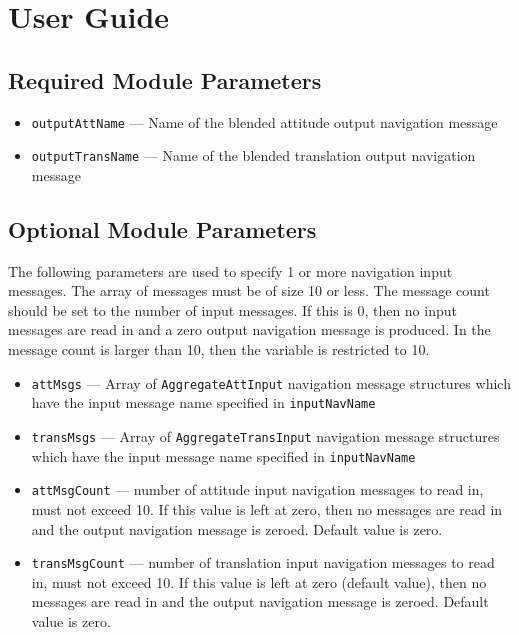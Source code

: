 
\section{User Guide}
\subsection{Required Module Parameters}
\begin{itemize}
	\item {\tt outputAttName} --- Name of the blended attitude output navigation message 
	\item {\tt outputTransName} --- Name of the blended translation output navigation message 
\end{itemize}


\subsection{Optional Module Parameters}
The following parameters are used to specify 1 or more navigation input messages.  The array of messages must be of size 10 or less.  The message count should be set to the number of input messages.  If this is 0, then no input messages are read in and a zero output navigation message is produced.  In the message count is larger than 10, then the variable is restricted to 10.  
\begin{itemize}
	\item {\tt attMsgs} --- Array of {\tt AggregateAttInput} navigation message structures which have the input message name specified in {\tt inputNavName}
	\item {\tt transMsgs} --- Array of {\tt AggregateTransInput} navigation message structures which have the input message name specified in {\tt inputNavName}
	\item {\tt attMsgCount} --- number of attitude input navigation messages to read in, must not exceed 10.  If this value is left at zero, then no messages are read in and the output navigation message is zeroed. Default value is zero.
	\item {\tt transMsgCount} --- number of translation input navigation messages to read in, must not exceed 10.  If this value is left at zero (default value), then no messages are read in and the output navigation message is zeroed.  Default value is zero.
\end{itemize}


